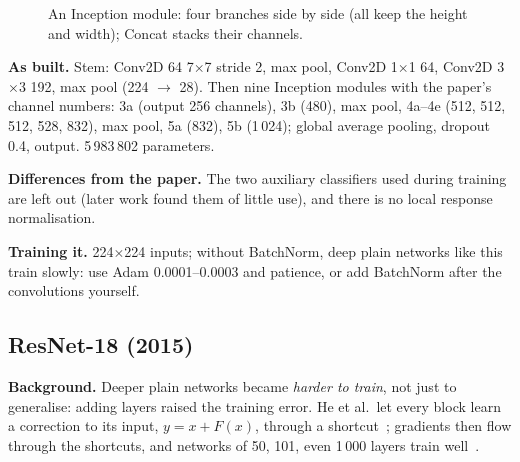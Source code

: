\documentclass[11pt,a4paper]{article}
\begin{document}
\begin{figure}[htbp]\centering
{}
\caption{An Inception module: four branches side by side (all keep the height and width); Concat stacks their channels.}
\end{figure}

\textbf{As built.} Stem: Conv2D 64 7$\times$7 stride 2, max pool, Conv2D 1$\times$1 64, Conv2D 3$\times$3 192, max pool (224
$\rightarrow$ 28). Then nine Inception modules with the paper's channel numbers: 3a (output 256 channels), 3b (480), max pool, 4a--4e
(512, 512, 512, 528, 832), max pool, 5a (832), 5b (1\,024); global average pooling, dropout 0.4, output. 5\,983\,802 parameters.

\textbf{Differences from the paper.} The two auxiliary classifiers used during training are left out (later work found them of little
use), and there is no local response normalisation.

\textbf{Training it.} 224$\times$224 inputs; without BatchNorm, deep plain networks like this train slowly: use Adam 0.0001--0.0003 and
patience, or add BatchNorm after the convolutions yourself.

\subsection{ResNet-18 (2015)}
\textbf{Background.} Deeper plain networks became \emph{harder to train}, not just to generalise: adding layers raised the training error.
He et al.\ let every block learn a correction to its input, $y = x + F(x)$, through a shortcut~\cite{he2015resnet}; gradients then flow
through the shortcuts, and networks of 50, 101, even 1\,000 layers train well~\cite{he2016identity}.
\end{document}
